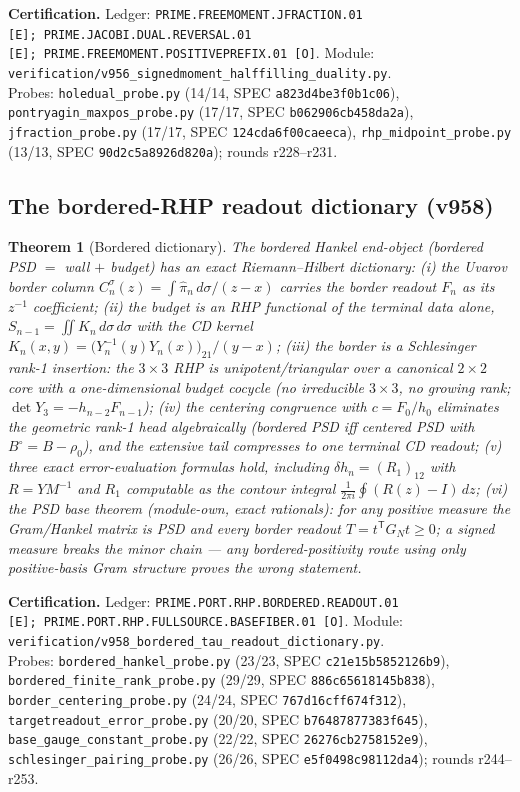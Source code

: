 \documentclass[11pt]{article}
\newcommand{\certbox}[3]{%
  \par\medskip\noindent\colorbox{certgray}{\parbox{\dimexpr\linewidth-2\fboxsep}{%
    \footnotesize\raggedright\textbf{Certification.} Ledger: \texttt{#1}.\quad
    Module: \texttt{#2}.\\ #3}}\par\medskip}
\newtheorem{theorem}{Theorem}[section]
\theoremstyle{definition}
\theoremstyle{remark}
\begin{document}
\certbox{PRIME.FREEMOMENT.JFRACTION.01 [E];\ PRIME.JACOBI.DUAL.REVERSAL.01 [E];\
PRIME.FREEMOMENT.POSITIVEPREFIX.01 [O]}%
{verification/v956\_signedmoment\_halffilling\_duality.py}%
{Probes: \texttt{holedual\_probe.py} (14/14, SPEC \texttt{a823d4be3f0b1c06}),
\texttt{pontryagin\_maxpos\_probe.py} (17/17, SPEC \texttt{b062906cb458da2a}),
\texttt{jfraction\_probe.py} (17/17, SPEC \texttt{124cda6f00caeeca}),
\texttt{rhp\_midpoint\_probe.py} (13/13, SPEC \texttt{90d2c5a8926d820a});
rounds r228--r231.}

\subsection{The bordered-RHP readout dictionary (v958)}

\begin{theorem}[Bordered dictionary]\label{thm:v958}
The bordered Hankel end-object (bordered PSD $=$ wall $+$ budget) has an
exact Riemann--Hilbert dictionary:
(i) the Uvarov border column $C^{\sigma}_n(z)=\int \hat\pi_n\,
d\sigma/(z-x)$ carries the border readout $F_n$ as its $z^{-1}$
coefficient;
(ii) the budget is an RHP functional of the terminal data alone,
$S_{n-1}=\iint K_n\,d\sigma\,d\sigma$ with the CD kernel
$K_n(x,y)=\bigl(Y_n^{-1}(y)Y_n(x)\bigr)_{21}/(y-x)$;
(iii) the border is a Schlesinger rank-1 insertion: the $3\times3$ RHP is
unipotent/triangular over a canonical $2\times2$ core with a
one-dimensional budget cocycle (no irreducible $3\times3$, no growing
rank; $\det Y_3=-h_{n-2}F_{n-1}$);
(iv) the centering congruence with $c=F_0/h_0$ eliminates the geometric
rank-1 head algebraically (bordered PSD iff centered PSD with
$B^{\circ}=B-\rho_0$), and the extensive tail compresses to one terminal
CD readout;
(v) three exact error-evaluation formulas hold, including
$\delta h_n=(R_1)_{12}$ with $R=YM^{-1}$ and $R_1$ computable as the
contour integral $\frac1{2\pi i}\oint(R(z)-I)\,dz$;
(vi) the PSD base theorem (module-own, exact rationals): for any positive
measure the Gram/Hankel matrix is PSD and every border readout
$T=t^{\mathsf T}G_Nt\ge0$; a signed measure breaks the minor chain --- any
bordered-positivity route using only positive-basis Gram structure proves
the wrong statement.
\end{theorem}

\certbox{PRIME.PORT.RHP.BORDERED.READOUT.01 [E];\
PRIME.PORT.RHP.FULLSOURCE.BASEFIBER.01 [O]}%
{verification/v958\_bordered\_tau\_readout\_dictionary.py}%
{Probes: \texttt{bordered\_hankel\_probe.py} (23/23, SPEC \texttt{c21e15b5852126b9}),
\texttt{bordered\_finite\_rank\_probe.py} (29/29, SPEC \texttt{886c65618145b838}),
\texttt{border\_centering\_probe.py} (24/24, SPEC \texttt{767d16cff674f312}),
\texttt{targetreadout\_error\_probe.py} (20/20, SPEC \texttt{b76487877383f645}),
\texttt{base\_gauge\_constant\_probe.py} (22/22, SPEC \texttt{26276cb2758152e9}),
\texttt{schlesinger\_pairing\_probe.py} (26/26, SPEC \texttt{e5f0498c98112da4});
rounds r244--r253.}
\end{document}
